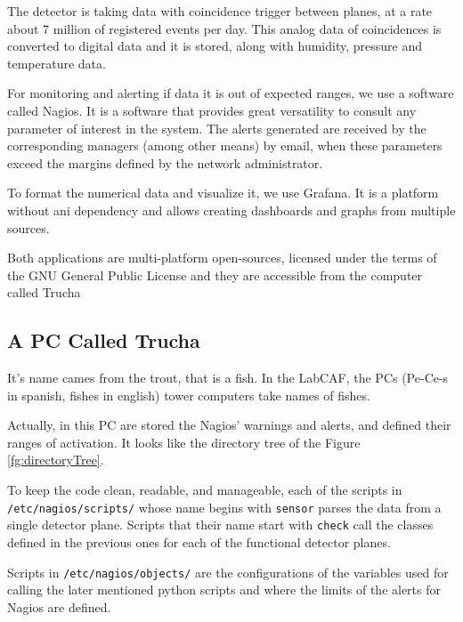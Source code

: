 The detector is taking data with coincidence trigger between planes, at a rate about 7 million of registered events per day. This analog data of coincidences is converted to digital data and it is stored, along with humidity, pressure and temperature data.

For monitoring and alerting if data it is out of expected ranges, we use a software called Nagios. It is a software that provides great versatility to consult any parameter of interest in the system. The alerts generated are received by the corresponding managers (among other means) by email, when these parameters exceed the margins defined by the network administrator.

To format the numerical data and visualize it, we use Grafana. It is a platform without ani dependency and allows creating dashboards and graphs from multiple sources.

Both applications are multi-platform open-sources, licensed under the terms of the GNU General Public License and they are accessible from the computer called Trucha

\subsection{A PC Called Trucha}

It's name cames from the trout, that is a fish. In the LabCAF, the PCs (Pe-Ce-s in spanish, fishes in english) tower computers take names of fishes.

Actually, in this PC are stored the Nagios' warnings and alerts, and defined their ranges of activation. It looks like the directory tree of the Figure \ref{fg:directoryTree}.

To keep the code clean, readable, and manageable, each of the scripts in \texttt{/etc/nagios/scripts/} whose name begins with \texttt{sensor} parses the data from a single detector plane. Scripts that their name start with \texttt{check} call the classes defined in the previous ones for each of the functional detector planes.

Scripts in \texttt{/etc/nagios/objects/} are the configurations of the variables used for calling the later mentioned python scripts and where the limits of the alerts for Nagios are defined.




